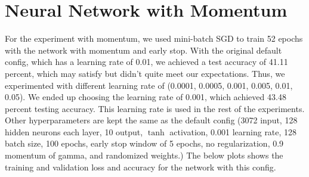 \documentclass{article}
\begin{document}
    \section{Neural Network with Momentum}\label{sec:neural-network-with-momentum}
    For the experiment with momentum, we used mini-batch SGD to train 52 epochs with the network with momentum and early stop.
    With the original default config, which has a learning rate of 0.01, we achieved a test accuracy of 41.11 percent, which may satisfy
    but didn't quite meet our expectations.
    Thus, we experimented with different learning rate of (0.0001, 0.0005, 0.001, 0.005, 0.01, 0.05).
    We ended up choosing the learning rate of 0.001, which achieved 43.48 percent testing accuracy.
    This learning rate is used in the rest of the experiments.
    Other hyperparameters are kept the same as the default config (3072 input, 128 hidden neurons each layer, 10 output,
    $\tanh$ activation, 0.001 learning rate, 128 batch size, 100 epochs, early stop window of 5 epochs, no regularization, 0.9 momentum of gamma,
    and randomized weights.) The below plots shows the training and validation loss and accuracy for the network with this config.
\end{document}
